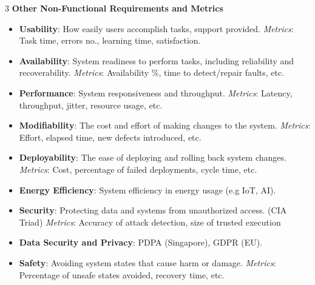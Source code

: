\documentclass[a4paper, 10pt, landscape]{article}
\begin{document}
\begin{multicols*}{3}
\textbf{Other Non-Functional Requirements and Metrics}
\begin{itemize}
    \item \textbf{Usability}: How easily users accomplish tasks, support provided. \textit{Metrics}: Task time, errors no., learning time, satisfaction.
    \item \textbf{Availability}: System readiness to perform tasks, including reliability and recoverability. \textit{Metrics}: Availability \%, time to detect/repair faults, etc.
    \item \textbf{Performance}: System responsiveness and throughput. \textit{Metrics}: Latency, throughput, jitter, resource usage, etc.
    \item \textbf{Modifiability}: The cost and effort of making changes to the system. \textit{Metrics}: Effort, elapsed time, new defects introduced, etc.
    \item \textbf{Deployability}: The ease of deploying and rolling back system changes. \textit{Metrics}: Cost, percentage of failed deployments, cycle time, etc.
    \item \textbf{Energy Efficiency}: System efficiency in energy usage (e.g IoT, AI).
    \item \textbf{Security}: Protecting data and systems from unauthorized access. (CIA Triad) \textit{Metrics}: Accuracy of attack detection, size of trusted execution 
    \item \textbf{Data Security and Privacy}: PDPA (Singapore), GDPR (EU).
    \item \textbf{Safety}: Avoiding system states that cause harm or damage.  \textit{Metrics}: Percentage of unsafe states avoided, recovery time, etc.
\end{itemize}



\end{multicols*}
\end{document}
